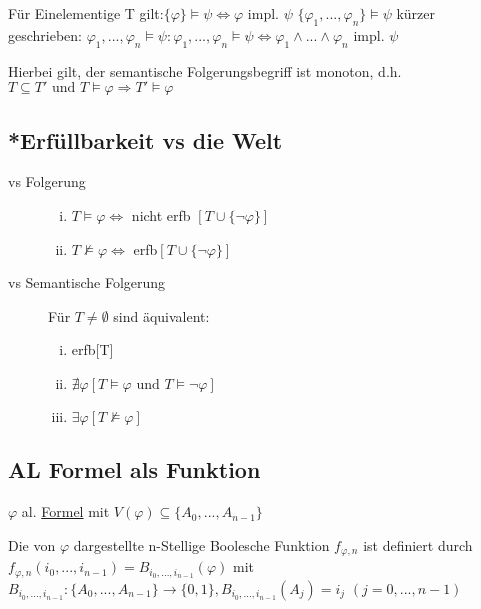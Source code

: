 \documentclass[12pt,a4paper]{article} %
\begin{document}
	Für Einelementige T gilt:$\{\varphi\} \hyperref[Erfullbar]{\vDash} \psi \Leftrightarrow \varphi$ impl. $\psi$ \newline
	$\{\varphi_1, ..., \varphi_n\} \hyperref[Erfullbar]{\vDash} \psi$ kürzer geschrieben: \newline $\varphi_1, ..., \varphi_n \hyperref[Erfullbar]{\vDash} \psi: \varphi_1, ..., \varphi_n \hyperref[Erfullbar]{\vDash} \psi \Leftrightarrow \varphi_1 \land ... \land \varphi_n$ impl. $\psi$
	
	Hierbei gilt, der semantische Folgerungsbegriff ist monoton, d.h. \newline
	$T \subseteq T'\text{ und } T \hyperref[Erfullbar]{\vDash} \varphi \Rightarrow T' \hyperref[Erfullbar]{\vDash} \varphi$
	
	\subsection{*Erfüllbarkeit vs die Welt}
	\begin{description}
		\item[vs Folgerung] \begin{enumerate}[(i)]
			\item $T \hyperref[Erfullbar]{\vDash} \varphi \Leftrightarrow$ nicht erfb $[T \cup \{\neg \varphi\}]$ \newline
			\item $T \nvDash \varphi \Leftrightarrow$ erfb$[T \cup \{\neg \varphi\}]$
		\end{enumerate}
		\item[vs Semantische Folgerung] Für $T \ne \emptyset$ sind äquivalent:
		\begin{enumerate}[(i)]
			\item erfb[T]
			\item $\nexists \varphi[T \hyperref[Erfullbar]{\vDash} \varphi \text{ und } T \hyperref[Erfullbar]{\vDash} \neg \varphi]$
			\item $\exists \varphi [T \nvDash \varphi]$
		\end{enumerate}
	\end{description}
	
	\subsection{AL Formel als Funktion}
	$\varphi$ al. \hyperref[Formel]{Formel} mit $V(\varphi) \subseteq \{A_0, ..., A_{n - 1}\}$
	
	Die von $\varphi$ dargestellte n-Stellige Boolesche Funktion $f_{\varphi, n}$ ist definiert durch $f_{\varphi, n}(i_0, ..., i_{n-1}) = \widehat{B}_{i_0, ..., i_{n - 1}}(\varphi)$ \newline
	mit $B_{i_0, ..., i_{n - 1}}: \{A_0, ..., A_{n - 1}\} \rightarrow \{0, 1\}, B_{i_0, ..., i_{n - 1}}(A_j) = i_j$ $(j = 0, ..., n - 1)$
	
\end{document}
